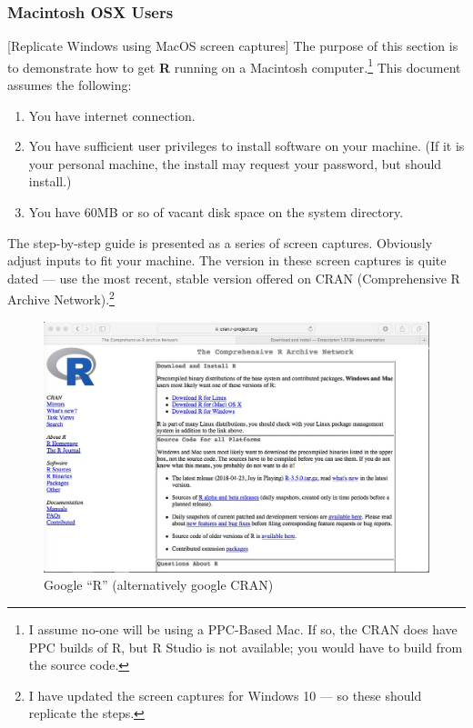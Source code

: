 \subsubsection{Macintosh OSX Users}
[Replicate Windows using MacOS screen captures]
The purpose of this section is to demonstrate how to get \textbf{R} running on a Macintosh computer.\footnote{I assume no-one will be using a PPC-Based Mac.  If so, the CRAN does have PPC builds of R, but R Studio is not available; you would have to build from the source code.}  
This document assumes the following:
\begin{enumerate}
\item You have internet connection.
\item You have sufficient user privileges to install software on your machine.  (If it is your personal machine, the install may request your password, but should install.)
\item You have 60MB or so of vacant disk space on the system directory.
\end{enumerate}

The step-by-step guide is presented as a series of screen captures.  Obviously adjust inputs to fit your machine.  The version in these screen captures is quite dated --- use the most recent, stable version offered on CRAN (Comprehensive R Archive Network).\footnote{I have updated the screen captures for Windows 10 --- so these should replicate the steps.}

\begin{figure}[h!] %
   \centering
   \includegraphics[width=5in]{./1-Introduction/GoogleRonMac.jpeg} 
   \caption{Google ``R'' (alternatively google CRAN)}
\end{figure}

